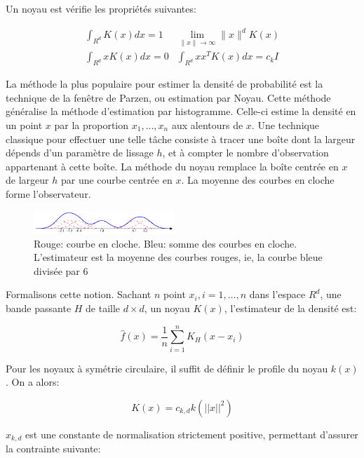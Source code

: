 \documentclass{article}
\begin{document}
Un noyau est vérifie les propriétés suivantes:

\begin{align*}
\int_{R^d} K(x)dx = 1 & \lim_{\|x\| \rightarrow \infty} \|x\|^d K(x) \\
\int_{R^d} x K(x) dx = 0 & \int_{R^d} xx^T K(x) dx = c_k I
\end{align*}

La méthode la plus populaire pour estimer la densité de probabilité est la
technique de la fenêtre de Parzen, ou estimation par Noyau. Cette méthode
généralise la méthode d'estimation par histogramme. Celle-ci estime la densité
en un point $x$ par la proportion $x_1, \dots, x_n$ aux alentours de $x$. Une
technique classique pour effectuer une telle tâche consiste à tracer une boîte
dont la largeur dépends d'un paramètre de lissage $h$, et à compter le nombre
d'observation appartenant à cette boîte.
La méthode du noyau remplace la boîte centrée en $x$ de largeur $h$ par une
courbe centrée en $x$. La moyenne des courbes en cloche forme l'observateur.

\begin{figure}[h]
\begin{center}
\includegraphics[width=200px]{images/Parzen_window_illustration.png}
\end{center}
\caption{Rouge: courbe en cloche. Bleu: somme des courbes en cloche.
L'estimateur est la moyenne des courbes rouges, ie, la courbe bleue divisée
par $6$}
\end{figure}

Formalisons cette notion. Sachant $n$ point $x_i, i = 1, \dots, n$
dans l'espace $R^d$, une bande passante $H$ de taille $d \times d$, un noyau
$K(x)$, l'estimateur de la densité est:

\begin{equation}
\hat{f}(x) = \frac{1}{n} \sum_{i = 1}^n K_H(x - x_i)
\end{equation}

Pour les noyaux à symétrie circulaire, il suffit de définir le profile du
noyau $k(x)$. On a alors:

\begin{equation}
K(x) = c_{k, d} k (|| x ||^2)
\end{equation}

$x_{k, d}$ est une constante de normalisation strictement positive, permettant
d'assurer la contrainte suivante:
\end{document}
